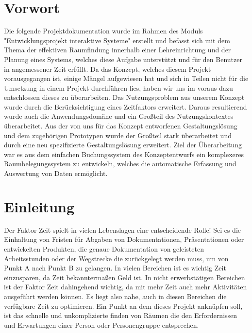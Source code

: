 
\section*{Vorwort}
\label{sec:Vorwort}

Die folgende Projektdokumentation wurde im Rahmen des Moduls
"Entwicklungsprojekt interaktive Systeme" erstellt und befasst sich mit dem
Thema der effektiven
Raumfindung innerhalb einer Lehreinrichtung und der Planung eines Systems,
welches diese Aufgabe unterstützt und für den Benutzer in angemessener Zeit
erfüllt.
Da das Konzept, welches diesem Projekt vorausgegangen ist, einige Mängel
aufgewiesen hat und sich in Teilen nicht für die Umsetzung in einem Projekt
durchführen lies, haben wir uns im voraus dazu entschlossen dieses zu
überarbeiten.
Das Nutzungsproblem aus unserem Konzept wurde durch die Berücksichtigung eines
Zeitfaktors erweitert. Daraus resultierend wurde auch die Anwendungsdomäne und
ein Großteil des Nutzungskontextes überarbeitet.
Aus der von uns für das Konzept entworfenen Gestaltungslösung und dem
zugehörigen Prototypen wurde der Großteil stark überarbeitet und durch eine neu
spezifizierte Gestaltungslösung erweitert.
Ziel der Überarbeitung war es aus dem einfachen Buchungssystem des
Konzeptentwurfs ein komplexeres Raumbelegungssystem zu entwickeln, welches die
automatische Erfassung und Auswertung von Daten ermöglicht.


\section{Einleitung}
\label{sec:Einleitung}

Der Faktor Zeit spielt in vielen Lebenslagen eine entscheidende Rolle! Sei es
die Einhaltung von Fristen für Abgaben von Dokumentationen, Präsentationen oder
entwickelten Produkten, die genaue Dokumentation von geleisteten Arbeitsstunden
oder der Wegstrecke die zurückgelegt werden muss, um von Punkt A nach Punkt B
zu gelangen. In vielen Bereichen ist es wichtig Zeit einzusparen, da Zeit
bekanntermaßen Geld ist. In nicht erwerbstätigen Bereichen ist der Faktor Zeit
dahingehend wichtig, da mit mehr Zeit auch mehr Aktivitäten ausgeführt werden
können. Es liegt also nahe, auch in diesen Bereichen die verfügbare Zeit zu
optimieren. Ein Punkt an dem dieses Projekt anknüpfen soll, ist das schnelle
und unkomplizierte finden von Räumen die den Erfordernissen und Erwartungen
einer Person oder Personengruppe entsprechen.



